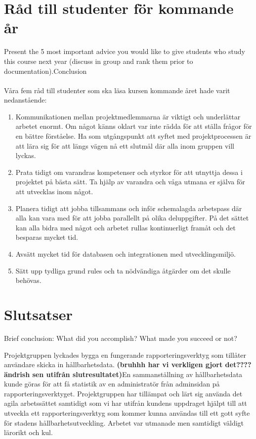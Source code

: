 \documentclass[12pt]{article}
\begin{document}
\section{Råd till studenter för kommande år}
Present the 5 most important advice you would like to give students who study this course next year (discuss in group and rank them prior to documentation).Conclusion\\\\
Våra fem råd till studenter som ska läsa kursen kommande året hade varit nedanstående:
\begin{enumerate}

\item  Kommunikationen mellan projektmedlemmarna är viktigt och underlättar arbetet enormt. Om något känns oklart var inte rädda för att ställa frågor för en bättre förståelse. Ha som utgångspunkt att syftet med projektprocessen är att lära sig för att längs vägen nå ett slutmål där alla inom gruppen vill lyckas.
\item Prata tidigt om varandras kompetenser och styrkor för att utnyttja dessa i projektet på bästa sätt. Ta hjälp av varandra och våga utmana er själva för att utvecklas inom något. 
\item  Planera tidigt att jobba tillsammans och inför schemalagda arbetspass där alla kan vara med för att jobba parallellt på olika deluppgifter. På det sättet kan alla bidra med något och arbetet rullas kontinuerligt framåt och det besparas mycket tid. 
\item  Avsätt mycket tid för databasen och integrationen med utvecklingsmiljö. 
\item  Sätt upp tydliga grund rules och ta nödvändiga åtgärder om det skulle behövas.        
\end{enumerate}

\section{Slutsatser}
Brief conclusion: What did you accomplish? What made you succeed or not? 

Projektgruppen lyckades bygga en fungerande rapporteringsverktyg som tillåter användare skicka in hållbarhetsdata.
\textbf{(bruhhh har vi verkligen gjort det???? ändrish sen utifrån slutresultatet)}En sammanställning av hållbarhetsdata kunde göras för att få statistik av en administratör från adminsidan på rapporteringsverktyget. Projektgruppen har tillämpat och lärt sig använda det agila arbetssättet samtidigt som vi har utifrån kundens uppdraget hjälpt till att utveckla ett  rapporteringsverktyg som kommer kunna användas till ett gott syfte för stadens hållbarhetsutveckling. Arbetet var utmanade men samtidigt väldigt lärorikt och kul. 
\end{document}
